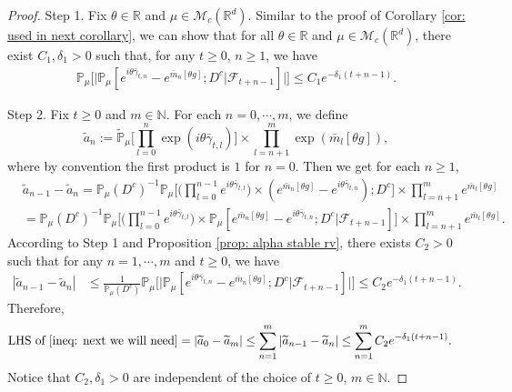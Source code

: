 \documentclass[12pt,a4paper]{amsart}
\theoremstyle{plain}
\theoremstyle{definition}
\numberwithin{equation}{section}
\begin{document}
\begin{proof}
  Step 1. Fix $\theta \in \mathbb R$ and $\mu \in \mathcal M_c(\mathbb R^d)$.
  Similar to the proof of Corollary \ref{cor: used in next corollary}, we can show that  for all $\theta\in \mathbb{R}$ and $\mu\in \mathcal{M}_c(\mathbb{R}^d)$, there exist $C_1,\delta_1>0$ such that, for any $t\geq 0$, $n\geq 1$, we have
  \begin{align}
    \mathbb{P}_{\mu}\Big[\big|\mathbb{P}_{\mu}[e^{i\theta\bar{\gamma}_{t,n}}-e^{\bar{m}_n[\theta g]}; D^c | \mathscr F_{t+n-1}]\big|\Big]\leq C_1e^{-\delta_1(t+n-1)}.
  \end{align}

  Step 2.
  Fix $t\geq 0$ and $m\in \mathbb{N}$.
  For each $n=0,\cdots,m$, we define
  \[
    \widetilde{a}_n
    := \mathbb{\widetilde{P}}_{\mu}\Big[\prod_{l=0}^{n}\exp(i\theta\bar{\gamma}_{t,l})\Big] \times \prod_{l=n+1}^{m}\exp(\bar{m}_l[\theta g]),
  \]
  where by convention the first product is $1$ for $n=0$. Then we get for each $n \ge 1$,
  \begin{align}
    & \widetilde{a}_{n-1} - \widetilde{a}_n
      = \mathbb{P}_{ \mu } ( D^c )^{ - 1 } \mathbb{P}_{ \mu } \Big[ \Big( \prod_{ l=0 }^{n - 1 } e^{ i \theta \bar{ \gamma }_{ t, l} } \Big) \times ( e^{ \bar{m}_n [ \theta g ] } - e^{ i \theta \bar{ \gamma }_{t, n}}) ; D^c \Big] \times \prod_{ l = n + 1}^{ m } e^{\bar{ m }_l[ \theta g ] } \\ 
    & = \mathbb{ P }_{ \mu }( D^c )^{ - 1 } \mathbb{P}_{ \mu } \Big[ \Big( \prod_{ l = 0 }^{n - 1} e^{ i \theta \bar{ \gamma }_{t, l} } \Big) \times \mathbb{P}_{\mu}[e^{\bar{m}_n[\theta g]}-e^{i\theta \bar{\gamma}_{t,n}};D^c|\mathscr{F}_{t+n-1}]\Big]\times \prod_{l=n+1}^{m}e^{\bar{m}_l[\theta g]}.
  \end{align}
  According to Step 1 and Proposition \ref{prop: alpha stable rv}, there exists $C_2>0$ such that for any $n=1,\cdots, m$ and $t\geq 0$, we have
  \begin{align}
    | \widetilde{a}_{n-1}- \widetilde{a}_n|
    & \leq \frac{1}{\mathbb{P}_{\mu}(D^c)}\mathbb{P}_{\mu}\Big[\big|\mathbb P_\mu[e^{i\theta\bar{\gamma}_{t,n}}-e^{\bar{m}_n[\theta g]}; D^c\big|\mathscr{F}_{t+n-1}]\big|\Big]
    \leq C_2 e^{-\delta_1(t+n-1)}.
  \end{align}
  Therefore,
  \begin{align}
    \text{LHS of \eqref{ineq: next we will need}}
    & = \left|\widetilde{a}_{0}-\widetilde{a}_m\right|
      \leq\sum_{n=1}^m\left|\widetilde{a}_{n-1}-\widetilde{a}_n\right|
      \leq \sum_{n=1}^m C_2 e^{-\delta_1(t+n-1)}.
  \end{align}
	Notice that $C_2, \delta_1>0$ are independent of the choice of $t\geq 0$, $m\in \mathbb{N}$.
\end{proof}
\end{document}
